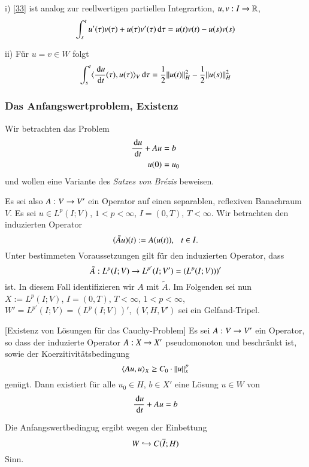 \begin{remark}
    \begin{description}
    \item{i)}
    \ref{33} ist analog zur reellwertigen partiellen Integrartion, $u,v:I\rightarrow \mathbb{R}$,
    \[
        \int_s^tu'(\tau)v(\tau) + u(\tau)v'(\tau) \, \mathrm{d} \tau = u(t)v(t)-u(s)v(s)
    \]
    \item{ii)}
    Für $u=v\in W$ folgt
    \[
        \int_s^t \langle \frac{\, \mathrm{d} u}{\, \mathrm{d} t}(\tau), u(\tau)\rangle_V \, \mathrm{d}\tau= \frac12 \|u(t)\|_H^2-\frac12\|u(s)\|
        _H^2
    \]
    \end{description}
\end{remark}

\subsubsection*{Das Anfangswertproblem, Existenz}

Wir betrachten das Problem
\begin{align*}
    \frac{\, \mathrm{d} u}{\, \mathrm{d} t} + Au &= b\\
    u(0)&= u_0
\end{align*}
und wollen eine Variante des \textit{Satzes von Brézis} beweisen.

\noindent Es sei also $A:V\rightarrow V'$ ein Operator auf einen separablen, reflexiven Banachraum $V$. Es sei
$u\in L^p(I;V)$, $1<p<\infty$, $I=(0,T)$, $T<\infty$. Wir betrachten den induzierten Operator
\[
    (\tilde Au)(t) := A(u(t)), \hspace{.25cm} t\in I.
\]
Unter bestimmeten Voraussetzungen gilt für den induzierten Operator, dass
\[
    \tilde A: L^p(I;V) \rightarrow L^{p'}(I;V') = \left(L^p(I;V))\right)'    
\]
ist. In diesem Fall identifizieren wir $A$ mit $\tilde A$. Im Folgenden sei nun $X:= L^p(I;V)$,
$I=(0,T)$, $T<\infty$, $1<p<\infty$, $W'=L^{p'}(I;V)=(L^p(I;V))'$, $(V,H,V')$ sei ein Gelfand-Tripel.

\begin{theorem}\label{4.39} [Existenz von Lösungen für das Cauchy-Problem]
    Es sei $A:V\rightarrow V'$ ein Operator, so dass der induzierte Operator $A:X\rightarrow X'$ pseudomonoton und
    beschränkt ist, sowie der Koerzitivitätsbedingung
    \[
        \langle Au,u\rangle _X\geq C_0\cdot \|u\|_x^p
    \]
    genügt. Dann existiert für alle $u_0\in H$, $b\in X'$ eine Lösung $u\in W$ von
    \[
        \frac{\, \mathrm{d} u}{\, \mathrm{d} t}+ Au=b
    \]
\end{theorem}

\begin{remark}
    Die Anfangswertbedingug ergibt wegen der Einbettung
    \[
        W\hookrightarrow C(\overline I;H)
    \]
    Sinn.
\end{remark}

